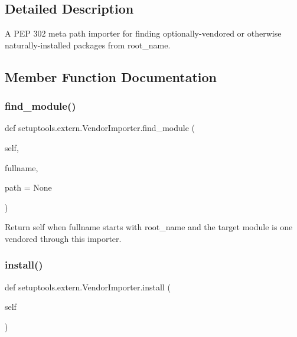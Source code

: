 \subsection{Detailed Description}
\begin{DoxyVerb}A PEP 302 meta path importer for finding optionally-vendored
or otherwise naturally-installed packages from root_name.
\end{DoxyVerb}
 

\subsection{Member Function Documentation}
\mbox{\label{classsetuptools_1_1extern_1_1_vendor_importer_a69fa6c7e9f28a8a4494f9e9651ea3314}} 
\subsubsection{\texorpdfstring{find\+\_\+module()}{find\_module()}}
{\footnotesize\ttfamily def setuptools.\+extern.\+Vendor\+Importer.\+find\+\_\+module (\begin{DoxyParamCaption}\item[{}]{self,  }\item[{}]{fullname,  }\item[{}]{path = {\ttfamily None} }\end{DoxyParamCaption})}

\begin{DoxyVerb}Return self when fullname starts with root_name and the
target module is one vendored through this importer.
\end{DoxyVerb}
 \mbox{\label{classsetuptools_1_1extern_1_1_vendor_importer_ac222230d5bb07d63d2749d23578015b1}} 
\subsubsection{\texorpdfstring{install()}{install()}}
{\footnotesize\ttfamily def setuptools.\+extern.\+Vendor\+Importer.\+install (\begin{DoxyParamCaption}\item[{}]{self }\end{DoxyParamCaption})}

